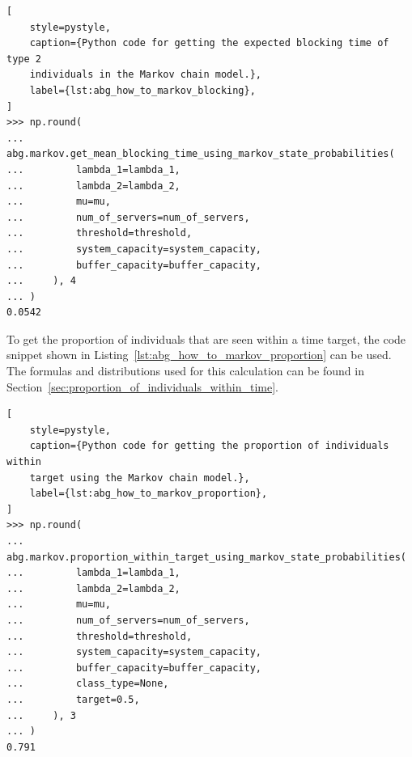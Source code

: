 \begin{lstlisting}[
    style=pystyle,
    caption={Python code for getting the expected blocking time of type 2
    individuals in the Markov chain model.},
    label={lst:abg_how_to_markov_blocking},
]
>>> np.round(
...     abg.markov.get_mean_blocking_time_using_markov_state_probabilities(
...         lambda_1=lambda_1,
...         lambda_2=lambda_2,
...         mu=mu,
...         num_of_servers=num_of_servers,
...         threshold=threshold,
...         system_capacity=system_capacity,
...         buffer_capacity=buffer_capacity,
...     ), 4
... )
0.0542

\end{lstlisting}

To get the proportion of individuals that are seen within a time target, the
code snippet shown in Listing~\ref{lst:abg_how_to_markov_proportion} can be
used.
The formulas and distributions used for this calculation can be found in
Section~\ref{sec:proportion_of_individuals_within_time}.

\begin{lstlisting}[
    style=pystyle,
    caption={Python code for getting the proportion of individuals within
    target using the Markov chain model.},
    label={lst:abg_how_to_markov_proportion},
]
>>> np.round(
...     abg.markov.proportion_within_target_using_markov_state_probabilities(
...         lambda_1=lambda_1,
...         lambda_2=lambda_2,
...         mu=mu,
...         num_of_servers=num_of_servers,
...         threshold=threshold,
...         system_capacity=system_capacity,
...         buffer_capacity=buffer_capacity,
...         class_type=None,
...         target=0.5,
...     ), 3
... )
0.791

\end{lstlisting}
